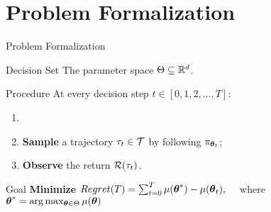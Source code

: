 \section{Problem Formalization}

\begin{frame}{Problem Formalization}

\onslide<+->\begin{block}{Decision Set}
The parameter space $\Theta\subseteq\mathbb{R}^d$.
\end{block}

\onslide<+->\begin{block}{Procedure}
At every decision step $t\in[0,1,2,\dots,T]$:
	\begin{enumerate}
			\item<+-|alert@+> 
			\item<+-|alert@+> \textbf{Sample} a trajectory $\tau_t\in\mathcal{T}$ by following $\pi_{\boldsymbol{\theta}_t}$;
			\item<+-|alert@+> \textbf{Observe} the return $\mathcal{R}(\tau_t)$.
		\end{enumerate}
\end{block}


\onslide<+->\begin{block}{Goal}
\textbf{Minimize} $Regret(T) = \sum_{t=0}^{T}\mu(\boldsymbol{\theta}^*)-\mu(\boldsymbol{\theta}_t), \quad$ where $\boldsymbol{\theta}^*=\arg\max_{\boldsymbol{\theta}\in\Theta}\mu(\boldsymbol{\theta})$
\end{block}




\end{frame}

